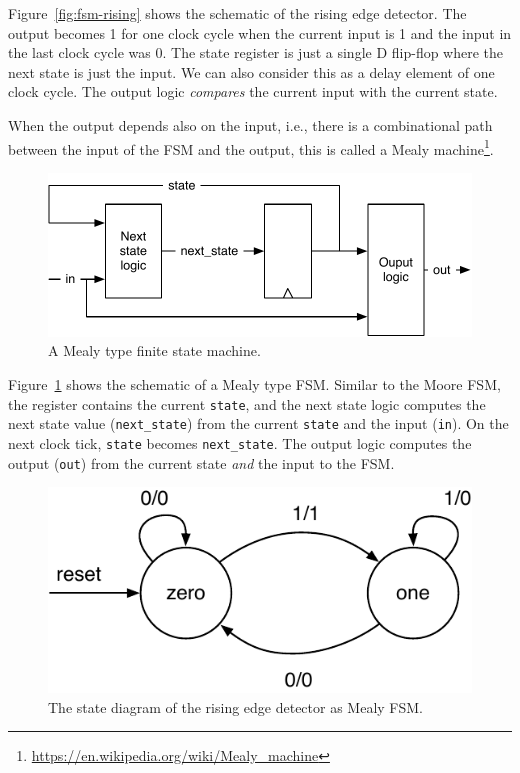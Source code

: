 \documentclass[%
    10pt,
    headinclude, footexclude,
    openright, %
    notitlepage,
    cleardoubleempty,
    headsepline,
    pointlessnumbers,
    bibtotoc, idxtotoc,
    ]{scrbook}
\newcommand{\code}[1]{{\small{\texttt{#1}}}}
\newcommand{\scale}{0.7}
\newcommand{\myref}[2]{\href{#1}{#2}}
\renewcommand{\myref}[2]{{#2}{\footnote{\url{#1}}}}
\begin{document}
Figure~\ref{fig:fsm-rising} shows the schematic of the rising edge detector.
The output becomes 1 for one clock cycle when the current input is 1
and the input in the last clock cycle was 0.
The state register is just a single D flip-flop where the next state
is just the input. We can also consider this as a delay element of one
clock cycle. The output logic \emph{compares} the current
input with the current state.



When the output depends also on the input, i.e., there is a combinational path between
the input of the FSM and the output, this is called a
\myref{https://en.wikipedia.org/wiki/Mealy_machine}{Mealy machine}.

\begin{figure}
  \centering
  \includegraphics[scale=\scale]{figures/mealy}
  \caption{A Mealy type finite state machine.}
  \label{fig:mealy}
\end{figure}

Figure~\ref{fig:mealy} shows the schematic of a Mealy type FSM.
Similar to the Moore FSM, the register contains the current \code{state}, and
the next state logic computes the next state value (\code{next\_state})
from the current \code{state} and the input (\code{in}).
On the next clock tick, \code{state} becomes \code{next\_state}.
The output logic computes the output (\code{out}) from the current state
\emph{and} the input to the FSM.


\begin{figure}
  \centering
  \includegraphics[scale=\scale]{figures/state-diag-mealy}
  \caption{The state diagram of the rising edge detector as Mealy FSM.}
  \label{fig:diag:mealy}
\end{figure}
\end{document}

